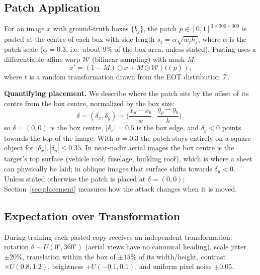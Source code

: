 \documentclass[conference]{IEEEtran}
\begin{document}
\subsection{Patch Application}
For an image $x$ with ground-truth boxes $\{b_j\}$, the patch $p\in[0,1]^{3\times300\times300}$
is pasted at the centre of each box with side length $s_j = \alpha\sqrt{w_j h_j}$, where
$\alpha$ is the patch scale ($\alpha=0.3$, i.e.\ about 9\% of the box area, unless stated).
Pasting uses a differentiable affine warp $\mathcal{W}$ (bilinear sampling) with mask $M$:
\begin{equation}
x' = (1 - M)\odot x + M\odot \mathcal{W}(t(p)),
\end{equation}
where $t$ is a random transformation drawn from the EOT distribution $\mathcal{T}$.

\textbf{Quantifying placement.} We describe where the patch sits by the offset of its centre
from the box centre, normalized by the box size:
\begin{equation}
\delta = (\delta_x,\delta_y) = \Big(\frac{x_p - x_b}{w},\; \frac{y_p - y_b}{h}\Big),
\end{equation}
so $\delta=(0,0)$ is the box centre, $|\delta_x|=0.5$ is the box edge, and $\delta_y<0$ points
towards the top of the image. With $\alpha=0.3$ the patch stays entirely on a square object
for $|\delta_x|,|\delta_y|\leq0.35$. In near-nadir aerial images the box centre is the
target's top surface (vehicle roof, fuselage, building roof), which is where a sheet can
physically be laid; in oblique images that surface shifts towards $\delta_y<0$. Unless stated
otherwise the patch is placed at $\delta=(0,0)$; Section~\ref{sec:placement} measures how
the attack changes when it is moved.

\subsection{Expectation over Transformation}
During training each pasted copy receives an independent transformation: rotation
$\theta\sim U(0^\circ,360^\circ)$ (aerial views have no canonical heading), scale jitter
$\pm20\%$, translation within the box of $\pm15\%$ of its width/height, contrast
$\times U(0.8,1.2)$, brightness $+U(-0.1,0.1)$, and uniform pixel noise $\pm0.05$.
\end{document}
